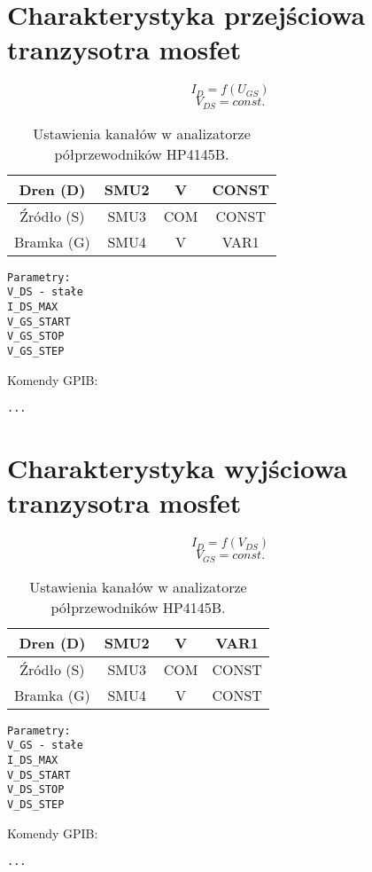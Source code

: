 \documentclass[a4paper]{article}
\begin{document}
\section{Charakterystyka przejściowa tranzysotra mosfet}
\begin{equation}
I_D = f(U_{GS})
\end{equation}
\begin{equation}
V_{DS} = const.
\end{equation}

\begin{table} [H]
\centering
\begin{tabular} {|c|c|c|c|}
\hline
Dren (D) & SMU2 & V & CONST\\ \hline
Źródło (S) & SMU3 & COM & CONST\\ \hline
Bramka (G) & SMU4 & V & VAR1\\ \hline
\end{tabular}
\caption{Ustawienia kanałów w analizatorze półprzewodników HP4145B.}
\end{table}

\begin{verbatim}
Parametry:
V_DS - stałe
I_DS_MAX
V_GS_START
V_GS_STOP
V_GS_STEP
\end{verbatim}
Komendy GPIB:
\begin{verbatim}
...
\end{verbatim}

\section{Charakterystyka wyjściowa tranzysotra mosfet}
\begin{equation}
I_D = f(V_{DS})
\end{equation}
\begin{equation}
V_{GS} = const.
\end{equation}

\begin{table} [H]
\centering
\begin{tabular} {|c|c|c|c|}
\hline
Dren (D) & SMU2 & V & VAR1\\ \hline
Źródło (S) & SMU3 & COM & CONST\\ \hline
Bramka (G) & SMU4 & V & CONST\\ \hline
\end{tabular}
\caption{Ustawienia kanałów w analizatorze półprzewodników HP4145B.}
\end{table}

\begin{verbatim}
Parametry:
V_GS - stałe
I_DS_MAX
V_DS_START
V_DS_STOP
V_DS_STEP
\end{verbatim}
Komendy GPIB:
\begin{verbatim}
...
\end{verbatim}
\end{document}
